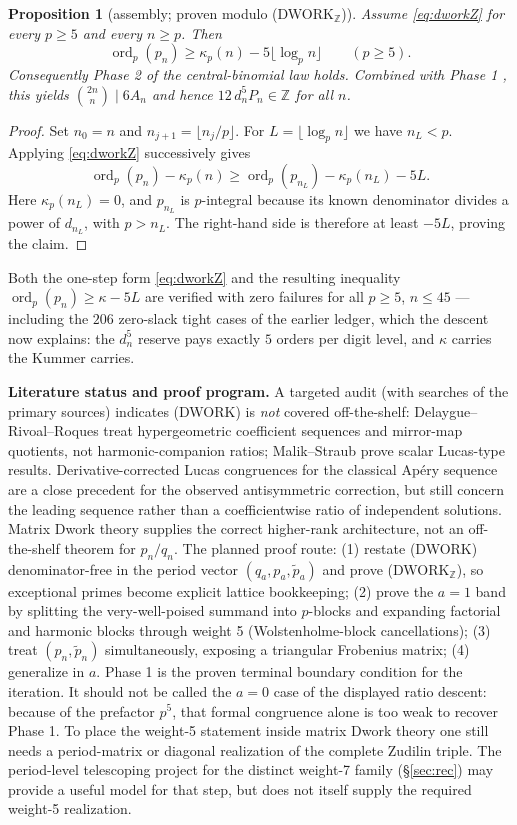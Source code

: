 \documentclass[11pt]{article}
\newtheorem{proposition}[theorem]{Proposition}\newtheorem{conjecture}[theorem]{Conjecture}
\theoremstyle{definition}\newtheorem{remark}[theorem]{Remark}
\DeclareMathOperator{\ord}{ord}\DeclareMathOperator{\den}{den}\DeclareMathOperator{\lcm}{lcm}
\newcommand{\Z}{\mathbb{Z}}\newcommand{\Q}{\mathbb{Q}}\newcommand{\Fp}{\mathbb{F}_p}
\newcommand{\wt}{\widetilde}\newcommand{\dn}{d_n}
\begin{document}
\begin{proposition}[assembly; proven modulo (DWORK$_\Z$)]\label{prop:assembly}
Assume \eqref{eq:dworkZ} for every $p\ge5$ and every $n\ge p$. Then
\[
 \ord_p(p_n)\ge \kappa_p(n)-5\lfloor\log_p n\rfloor
 \qquad(p\ge5).
\]
Consequently Phase 2 of the central-binomial law holds. Combined with Phase
1 \cite{CBcert}, this yields $\binom{2n}{n}\mid6A_n$ and hence
$12\,d_n^5P_n\in\Z$ for all $n$.
\end{proposition}

\begin{proof}
Set $n_0=n$ and $n_{j+1}=\lfloor n_j/p\rfloor$. For
$L=\lfloor\log_p n\rfloor$ we have $n_L<p$. Applying
\eqref{eq:dworkZ} successively gives
\[
 \ord_p(p_n)-\kappa_p(n)
 \ge \ord_p(p_{n_L})-\kappa_p(n_L)-5L.
\]
Here $\kappa_p(n_L)=0$, and $p_{n_L}$ is $p$-integral because its known
denominator divides a power of $d_{n_L}$, with $p>n_L$. The right-hand side
is therefore at least $-5L$, proving the claim.
\end{proof}

Both the one-step form \eqref{eq:dworkZ} and the resulting inequality
$\ord_p(p_n)\ge\kappa-5L$ are verified with zero
failures for all $p\ge5$, $n\le45$ --- including the $206$ zero-slack tight
cases of the earlier ledger, which the descent now explains: the $d_n^5$
reserve pays exactly $5$ orders per digit level, and $\kappa$ carries the
Kummer carries.

\smallskip\noindent\textbf{Literature status and proof program.} A targeted
audit (with searches of the primary sources) indicates (DWORK) is \emph{not}
covered off-the-shelf: Delaygue--Rivoal--Roques \cite{DRR} treat
hypergeometric coefficient sequences and mirror-map quotients, not
harmonic-companion ratios; Malik--Straub \cite{MalikStraub} prove scalar
Lucas-type results. Derivative-corrected Lucas congruences for the classical
Ap\'ery sequence \cite{RYK} are a close precedent for the observed
antisymmetric correction, but still concern the leading sequence rather than
a coefficientwise ratio of independent solutions. Matrix Dwork theory
\cite{BeukersMatrix} supplies the correct higher-rank architecture, not an
off-the-shelf theorem for $p_n/q_n$. The
planned proof route: (1) restate (DWORK) denominator-free in the period
vector $(q_a,p_a,\wt p_a)$ and prove (DWORK$_\Z$), so exceptional primes
become explicit lattice bookkeeping;
(2) prove the $a=1$ band by splitting the very-well-poised summand into
$p$-blocks and expanding factorial and harmonic blocks through weight 5
(Wolstenholme-block cancellations); (3) treat $(p_n,\wt p_n)$ simultaneously,
exposing a triangular Frobenius matrix; (4) generalize in $a$. Phase 1 is the
proven terminal boundary condition for the iteration. It should not be called
the $a=0$ case of the displayed ratio descent: because of the prefactor $p^5$,
that formal congruence alone is too weak to recover Phase 1. To place the
weight-5 statement inside matrix Dwork theory
one still needs a period-matrix or diagonal realization of the complete
Zudilin triple. The period-level telescoping project for the distinct
weight-7 family (\S\ref{sec:rec}) may provide a useful model for that step, but
does not itself supply the required weight-5 realization.
\end{document}
